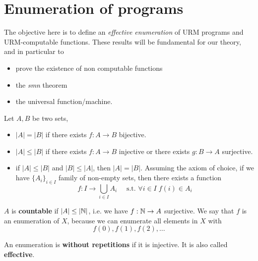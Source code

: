 \chapter{Enumeration of programs}
\newcommand{\pr}{\mathcal{PR}}
The objective here is to define an \emph{effective enumeration} of URM
programs and URM-computable functions. These results will be
fundamental for our theory, and in particular to
\begin{itemize}
\item prove the existence of non computable functions
\item the \textit{smn} theorem
\item the universal function/machine.
\end{itemize}

\begin{remark}
  Let $ A, B $ be two sets,
\begin{itemize}
\item $ |A| = |B| $ if there exists $ f:A\to B$ bijective.

\item $|A| \leq |B|$ if there exists $f:A\to B$ injective or
  there exists $g:B\to A$ surjective.

\item if $|A| \leq |B|$ and $|B| \leq |A|$, then $|A|=|B|$.
  Assuming the axiom of choice, if we have $\{A_i\}_{i \in I}$ family
  of non-empty sets, then
  there exists a function $$f:I \to \bigcup_{i \in I}A_i \quad
  \text{ s.t. }  \forall i \in I\; f(i) \in A_i$$
\end{itemize}
\end{remark}

\begin{definition}
  $A$ is \textbf{countable} if $ |A| \leq |\mathbb{N}| $, i.e. we have
$f: \mathbb{N} \to A$ surjective. We say that
$f$ is an enumeration of $X$, because we can enumerate all
elements in $X$ with \[f(0), f(1), f(2), \dots \]
\end{definition}

\begin{definition}
  An enumeration is \textbf{without repetitions} if it is injective.
  It is also called \textbf{effective}.
\end{definition}

